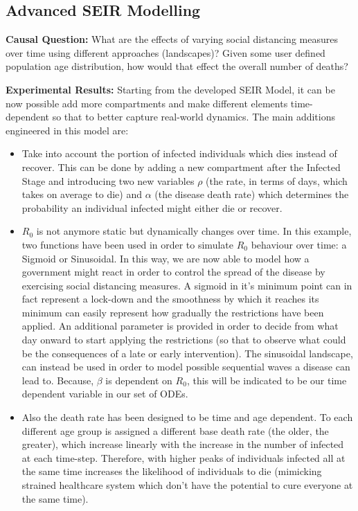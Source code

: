 \subsection{Advanced SEIR Modelling}
\label{cov_model}

\textbf{Causal Question:} What are the effects of varying social distancing measures over time using different approaches (landscapes)? Given some user defined population age distribution, how would that effect the overall number of deaths?

\textbf{Experimental Results:} Starting from the developed SEIR Model, it can be now possible add more compartments and make different elements time-dependent so that to better capture real-world dynamics. The main additions engineered in this model are:
\begin{itemize}
    \item Take into account the portion of infected individuals which dies instead of recover. This can be done by adding a new compartment after the Infected Stage and introducing two new variables $\rho$ (the rate, in terms of days, which takes on average to die) and $\alpha$ (the disease death rate) which determines the probability an individual infected might either die or recover.
    \item $R_{0}$ is not anymore static but dynamically changes over time. In this example, two functions have been used  in order to simulate $R_{0}$ behaviour over time: a Sigmoid or Sinusoidal. In this way, we are now able to model
    how a government might react in order to control the spread of the disease by exercising social distancing measures. A sigmoid in it's minimum point can in fact represent a lock-down and the smoothness by which it reaches its minimum can
    easily represent how gradually the restrictions have been applied. An additional parameter is provided in order to decide from what day onward to start applying the restrictions (so that to observe what could be the consequences of a late or early intervention). The sinusoidal landscape, can instead be used in order to model possible sequential waves a disease can lead to. Because, $\beta$ is dependent on  $R_{0}$, this will be indicated to be our time dependent variable in our set of ODEs. 
    \item Also the death rate has been designed to be time and age dependent. To each different age group is assigned a different base death rate (the older, the greater), which increase linearly with the increase in the number of infected at each time-step. Therefore, with higher peaks of individuals infected all at the same time increases the likelihood of individuals to die (mimicking strained healthcare system which don't have the potential to cure everyone at the same time).
\end{itemize}

